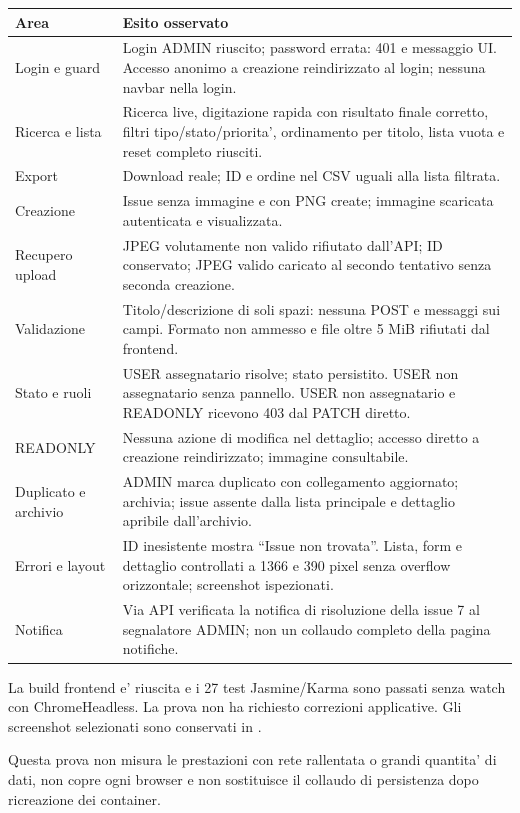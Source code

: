 \documentclass[11pt,a4paper,oneside]{report}
\begin{document}
\begin{longtable}{P{0.32\textwidth} P{0.61\textwidth}}
\toprule Area & Esito osservato\\\midrule\endhead
Login e guard & Login ADMIN riuscito; password errata: 401 e messaggio UI. Accesso anonimo a creazione reindirizzato al login; nessuna navbar nella login.\\
Ricerca e lista & Ricerca live, digitazione rapida con risultato finale corretto, filtri tipo/stato/priorita', ordinamento per titolo, lista vuota e reset completo riusciti.\\
Export & Download reale; ID e ordine nel CSV uguali alla lista filtrata.\\
Creazione & Issue senza immagine e con PNG create; immagine scaricata autenticata e visualizzata.\\
Recupero upload & JPEG volutamente non valido rifiutato dall'API; ID conservato; JPEG valido caricato al secondo tentativo senza seconda creazione.\\
Validazione & Titolo/descrizione di soli spazi: nessuna POST e messaggi sui campi. Formato non ammesso e file oltre 5 MiB rifiutati dal frontend.\\
Stato e ruoli & USER assegnatario risolve; stato persistito. USER non assegnatario senza pannello. USER non assegnatario e READONLY ricevono 403 dal PATCH diretto.\\
READONLY & Nessuna azione di modifica nel dettaglio; accesso diretto a creazione reindirizzato; immagine consultabile.\\
Duplicato e archivio & ADMIN marca duplicato con collegamento aggiornato; archivia; issue assente dalla lista principale e dettaglio apribile dall'archivio.\\
Errori e layout & ID inesistente mostra ``Issue non trovata''. Lista, form e dettaglio controllati a 1366 e 390 pixel senza overflow orizzontale; screenshot ispezionati.\\
Notifica & Via API verificata la notifica di risoluzione della issue 7 al segnalatore ADMIN; non un collaudo completo della pagina notifiche.\\
\bottomrule
\end{longtable}
La build frontend e' riuscita e i 27 test Jasmine/Karma sono passati senza
watch con ChromeHeadless. La prova non ha richiesto correzioni applicative.
Gli screenshot selezionati sono conservati in
.

Questa prova non misura le prestazioni con rete rallentata o grandi
quantita' di dati, non copre ogni browser e non sostituisce il collaudo
di persistenza dopo ricreazione dei container.
\end{document}
